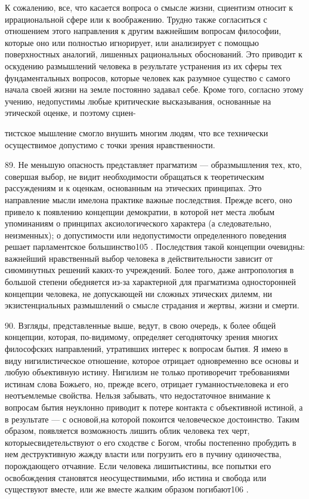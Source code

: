 \documentclass[a5paper,10pt]{article}
\begin{document}
К сожалению, все, что касается вопроса о смысле жизни, сциентизм относит к
иррациональной сфере или к воображению. Трудно также согласиться с отношением
этого направления к другим важнейшим вопросам философии, которые оно или
полностью игнорирует, или анализирует с помощью поверхностных аналогий,
лишенных рациональных обоснований. Это приводит к оскудению размышлений
человека в результате устранения из их сферы тех фундаментальных вопросов,
которые человек как разумное существо с самого начала своей жизни на земле
постоянно задавал себе. Кроме того, согласно этому учению, недопустимы любые
критические высказывания, основанные на этической оценке, и поэтому сциен-

тистское мышление смогло внушить многим людям, что все технически осуществимое
допустимо с точки зрения нравственности.

89. Не меньшую опасность представляет прагматизм — образмышления тех, кто,
совершая выбор, не видит необходимости обращаться к теоретическим рассуждениям
и к оценкам, основанным на этических принципах. Это направление мысли имелона
практике важные последствия. Прежде всего, оно привело к появлению концепции
демократии, в которой нет места любым упоминаниям о принципах аксиологического
характера (а следовательно, неизменных); о допустимости или недопустимости
определенного поведения решает парламентское большинство105 . Последствия такой
концепции очевидны: важнейший нравственный выбор человека в действительности
зависит от сиюминутных решений каких-то учреждений. Более того, даже
антропология в большой степени обедняется из-за характерной для прагматизма
односторонней концепции человека, не допускающей ни сложных этических дилемм,
ни экзистенциальных размышлений о смысле страдания и жертвы, жизни и смерти.

90. Взгляды, представленные выше, ведут, в свою очередь, к более общей
концепции, которая, по-видимому, определяет сегодняточку зрения многих
философских направлений, утративших интерес к вопросам бытия. Я имею в виду
нигилистическое отношение, которое отрицает одновременно все основы и любую
объективную истину. Нигилизм не только противоречит требованиями истинам слова
Божьего, но, прежде всего, отрицает гуманностьчеловека и его неотъемлемые
свойства. Нельзя забывать, что недостаточное внимание к вопросам бытия
неуклонно приводит к потере контакта с объективной истиной, а в результате — с
основой,на которой покоится человеческое достоинство. Таким образом, появляется
возможность лишить облик человека тех черт, которыесвидетельствуют о его
сходстве с Богом, чтобы постепенно пробудить в нем деструктивную жажду власти
или погрузить его в пучину одиночества, порождающего отчаяние. Если человека
лишитьистины, все попытки его освобождения становятся неосуществимыми, ибо
истина и свобода или существуют вместе, или же вместе жалким образом
погибают106 .
\end{document}
